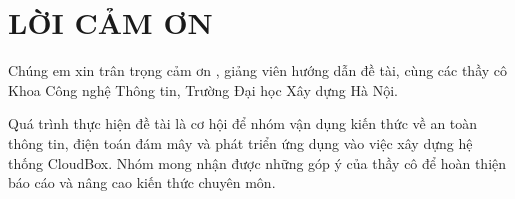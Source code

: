 \clearpage

\chapter*{LỜI CẢM ƠN}
\thispagestyle{loidausach}
Chúng em xin trân trọng cảm ơn \GiangVien, giảng viên hướng dẫn đề tài, cùng các thầy cô Khoa Công nghệ Thông tin, Trường Đại học Xây dựng Hà Nội.

Quá trình thực hiện đề tài là cơ hội để nhóm vận dụng kiến thức về an toàn thông tin, điện toán đám mây và phát triển ứng dụng vào việc xây dựng hệ thống CloudBox. Nhóm mong nhận được những góp ý của thầy cô để hoàn thiện báo cáo và nâng cao kiến thức chuyên môn.
\clearpage

\pagestyle{baocao}
\hypersetup{pageanchor=true}
\tableofcontents


